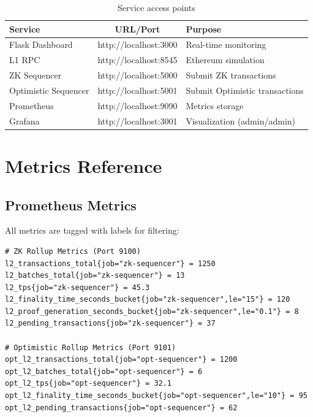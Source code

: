 \documentclass[
]{elteikthesis}[2024/04/26]
\begin{document}
\begin{table}[h]
    \centering
    \begin{tabular}{l|c|p{5cm}}
        \hline
        \textbf{Service} & \textbf{URL/Port} & \textbf{Purpose} \\
        \hline
        Flask Dashboard & http://localhost:3000 & Real-time monitoring \\
        \hline
        L1 RPC & http://localhost:8545 & Ethereum simulation \\
        \hline
        ZK Sequencer & http://localhost:5000 & Submit ZK transactions \\
        \hline
        Optimistic Sequencer & http://localhost:5001 & Submit Optimistic transactions \\
        \hline
        Prometheus & http://localhost:9090 & Metrics storage \\
        \hline
        Grafana & http://localhost:3001 & Visualization (admin/admin) \\
        \hline
    \end{tabular}
    \caption{Service access points}
    \label{tab:services}
\end{table}

\chapter{Metrics Reference}
\label{app:metrics}

\section{Prometheus Metrics}

All metrics are tagged with labels for filtering:

\begin{listing}[H]
    \begin{verbatim}
# ZK Rollup Metrics (Port 9100)
l2_transactions_total{job="zk-sequencer"} = 1250
l2_batches_total{job="zk-sequencer"} = 13
l2_tps{job="zk-sequencer"} = 45.3
l2_finality_time_seconds_bucket{job="zk-sequencer",le="15"} = 120
l2_proof_generation_seconds_bucket{job="zk-sequencer",le="0.1"} = 8
l2_pending_transactions{job="zk-sequencer"} = 37

# Optimistic Rollup Metrics (Port 9101)
opt_l2_transactions_total{job="opt-sequencer"} = 1200
opt_l2_batches_total{job="opt-sequencer"} = 6
opt_l2_tps{job="opt-sequencer"} = 32.1
opt_l2_finality_time_seconds_bucket{job="opt-sequencer",le="10"} = 95
opt_l2_pending_transactions{job="opt-sequencer"} = 62
    \end{verbatim}
    \caption{Example Prometheus output}
    \label{lst:prometheus-output}
\end{listing}
\end{document}
